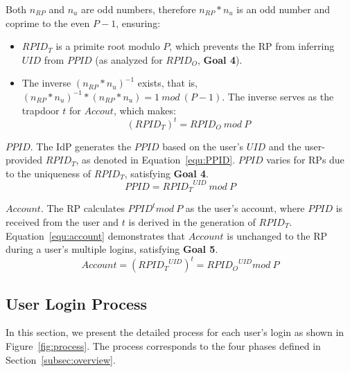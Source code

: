 Both $n_{RP}$ and $n_{u}$ are odd numbers, therefore $n_{RP}*n_{u}$ is an odd number and coprime to the even $P-1$, ensuring:
 \begin{itemize}
   \item $RPID_T$ is a primite root modulo $P$, which prevents the RP from inferring $UID$ from $PPID$ (as analyzed for $RPID_O$, \textbf{Goal 4}).
   \item The inverse $(n_{RP}*n_{u})^{-1}$ exists, that is, $(n_{RP}*n_{u})^{-1} * (n_{RP}*n_{u}) = 1 \ mod \ (P-1)$. The inverse  serves as  the trapdoor $t$ for $Accout$, which makes:
   \begin{equation}
   (RPID_T)^t = RPID_O \ mod \ P
   \label{equ:trapdoor}
   \end{equation}
 \end{itemize}

{$PPID$}. The IdP generates the $PPID$ based on the user's $UID$ and the user-provided $RPID_T$, as denoted in Equation~\ref{equ:PPID}. $PPID$ varies for RPs due to the uniqueness of $RPID_T$, satisfying \textbf{Goal 4}.
 \begin{equation}
   PPID = {RPID_T}^{UID} \ mod \ P
   \label{equ:PPID}
   \end{equation}

{$Account$}. The RP calculates $PPID^t mod \ P$ as the  user's account, where $PPID$ is received from the user and $t$ is derived in the generation of $RPID_T$. Equation~\ref{equ:account} demonstrates that $Account$ is unchanged to the RP during a user's multiple logins, satisfying \textbf{Goal 5}.
 \begin{equation}
   Account = ({RPID_T}^{UID})^t = {RPID_O}^{UID} mod \ P
   \label{equ:account}
   \end{equation}


\subsection{User Login Process}
\label{sebsec:loginprocess}
In this section, we present the detailed process for each user's login as shown in Figure~\ref{fig:process}. The process corresponds to the four phases defined in Section~\ref{subsec:overview}. 

